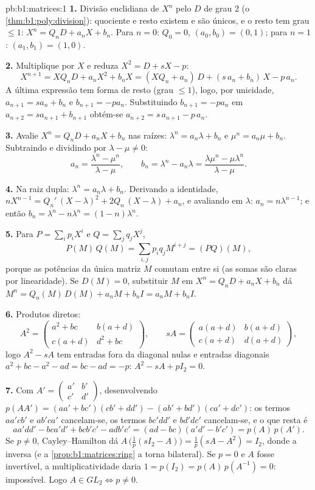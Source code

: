 \begin{solution}{pb:b1:matrices:1}
\textbf{1.} Divisão euclidiana de $X^n$ pelo  $D$ de grau $2$
(o \cref{thm:b1:poly:division}): quociente e resto existem e são únicos, e o resto tem
grau $\leq 1$: $X^n =
Q_n D + a_n X + b_n$. Para $n = 0$: $Q_0 = 0$, $(a_0, b_0) = (0,
1)$; para $n = 1$:
$(a_1, b_1) = (1, 0)$.

\textbf{2.} Multiplique por $X$ e reduza $X^2 = D + sX - p$:
\[
X^{n+1} = X Q_n D + a_n X^2 + b_n X
= (X Q_n + a_n)\,D + (s\,a_n + b_n)\,X - p\,a_n .
\]
A última expressão tem forma de resto (grau $\leq 1$), logo, por
unicidade, $a_{n+1} = s a_n + b_n$ e $b_{n+1} = -p a_n$. Substituindo $b_{n+1} = -pa_n$ em $a_{n+2} = s a_{n+1} +
b_{n+1}$ obtém-se
$a_{n+2} = s\,a_{n+1} - p\,a_n$.

\textbf{3.} Avalie $X^n = Q_n D + a_n X + b_n$ nas raízes: $\lambda^n = a_n\lambda + b_n$ e $\mu^n = a_n\mu + b_n$. Subtraindo e
dividindo por $\lambda - \mu \neq 0$:
\[
a_n = \frac{\lambda^n - \mu^n}{\lambda - \mu},
\qquad
b_n = \lambda^n - a_n\lambda
= \frac{\lambda\mu^n - \mu\lambda^n}{\lambda - \mu} .
\]

\textbf{4.} Na raiz dupla: $\lambda^n = a_n\lambda + b_n$. Derivando a identidade, $nX^{n-1} = Q_n'\,(X - \lambda)^2
+ 2Q_n\,(X - \lambda) + a_n$, e
avaliando em $\lambda$: $a_n
= n\lambda^{n-1}$; e então $b_n = \lambda^n - n\lambda^{n} = (1 -
n)\lambda^{n}$.

\textbf{5.} Para $P = \sum_i p_i X^i$ e $Q = \sum_j q_j X^j$,
\[
P(M)\,Q(M) = \sum_{i,j} p_i q_j M^{i+j} = (PQ)(M),
\]
porque as potências da única matriz $M$ comutam entre si (as somas
são claras por linearidade). Se $D(M) = 0$, substituir $M$ em $X^n = Q_n D + a_n X + b_n$ dá
$M^n = Q_n(M)\,D(M) + a_n
M + b_n I = a_n M + b_n I$.

\textbf{6.} Produtos diretos:
\[
A^2 = \begin{pmatrix}
a^2 + bc & b(a + d)\\
c(a + d) & d^2 + bc
\end{pmatrix},
\qquad
s A = \begin{pmatrix}
a(a+d) & b(a+d)\\
c(a+d) & d(a+d)
\end{pmatrix},
\]
logo $A^2 - sA$ tem entradas fora da diagonal nulas e entradas diagonais
$a^2 + bc - a^2 - ad = bc - ad = -p$: $A^2 - sA + pI_2 = 0$.

\textbf{7.} Com $A' = \begin{pmatrix} a' & b'\\ c' &
d'\end{pmatrix}$, desenvolvendo $p(AA') = (aa' + bc')(cb' + dd') -
(ab' + bd')(ca' + dc')$: os termos $aa'cb'$ e
$ab'ca'$ cancelam-se, os termos $bc'dd'$ e $bd'dc'$ cancelam-se, e
o que resta é
\[
aa'dd' - bca'd' + bcb'c' - adb'c'
= (ad - bc)(a'd' - b'c') = p(A)\,p(A').
\]
Se $p \neq 0$, Cayley--Hamilton dá $A\,\bigl(\tfrac1p(sI_2 -
A)\bigr) = \tfrac1p(sA - A^2) = I_2$, donde a inversa (e a \cref{prop:b1:matrices:ring} a
torna bilateral). Se $p = 0$ e $A$ fosse invertível, a
multiplicatividade daria $1 = p(I_2) =
p(A)\,p(A^{-1}) = 0$: impossível. Logo $A \in GL_2 \iff p \neq 0$.


\end{solution}
